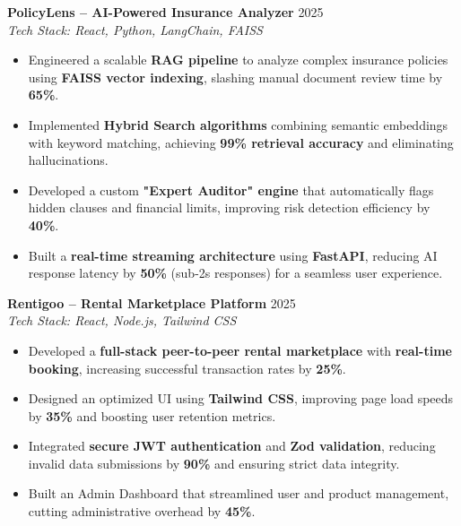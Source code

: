\documentclass[10pt, letterpaper]{article}
\begin{document}
\noindent \textbf{PolicyLens – AI-Powered Insurance Analyzer} \hfill 2025 \\
\textit{Tech Stack: React, Python, LangChain, FAISS} 
\begin{itemize}[noitemsep,topsep=0pt,parsep=0pt,partopsep=0pt,leftmargin=15pt]
    \item Engineered a scalable \textbf{RAG pipeline} to analyze complex insurance policies using \textbf{FAISS vector indexing}, slashing manual document review time by \textbf{65\%}.
    \item Implemented \textbf{Hybrid Search algorithms} combining semantic embeddings with keyword matching, achieving \textbf{99\% retrieval accuracy} and eliminating hallucinations.
    \item Developed a custom \textbf{"Expert Auditor" engine} that automatically flags hidden clauses and financial limits, improving risk detection efficiency by \textbf{40\%}.
    \item Built a \textbf{real-time streaming architecture} using \textbf{FastAPI}, reducing AI response latency by \textbf{50\%} (sub-2s responses) for a seamless user experience.
\end{itemize}
\vspace{5pt}

\noindent \textbf{Rentigoo -- Rental Marketplace Platform} \hfill 2025 \\
\textit{Tech Stack: React, Node.js, Tailwind CSS}
\begin{itemize}[noitemsep,topsep=0pt,parsep=0pt,partopsep=0pt,leftmargin=15pt]
    \item Developed a \textbf{full-stack peer-to-peer rental marketplace} with \textbf{real-time booking}, increasing successful transaction rates by \textbf{25\%}.
    \item Designed an optimized UI using \textbf{Tailwind CSS}, improving page load speeds by \textbf{35\%} and boosting user retention metrics.
    \item Integrated \textbf{secure JWT authentication} and \textbf{Zod validation}, reducing invalid data submissions by \textbf{90\%} and ensuring strict data integrity.
    \item Built an Admin Dashboard that streamlined user and product management, cutting administrative overhead by \textbf{45\%}.
\end{itemize}
\vspace{5pt}
\end{document}
